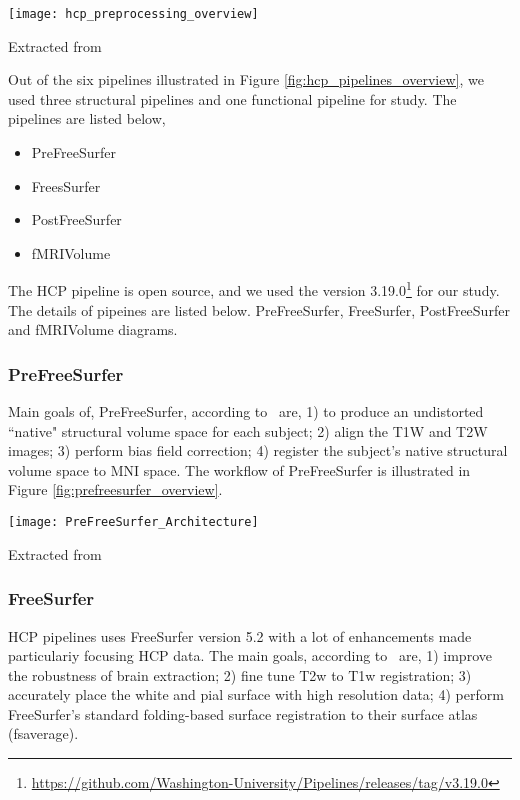 \begin{center}
   \texttt{[image: hcp\_preprocessing\_overview]}
   \label{fig:hcp_pipelines_overview}
   \caption*{Extracted from \cite{Gla13}}
\end{center}

Out of the six pipelines illustrated in Figure \ref{fig:hcp_pipelines_overview}, we used three structural pipelines and one functional pipeline for study. The pipelines are listed below, 
\begin{itemize}
  \item PreFreeSurfer
  \item FreesSurfer
  \item PostFreeSurfer
  \item fMRIVolume
\end{itemize}

The HCP pipeline is open source, and we used the version 3.19.0\footnote{\url{https://github.com/Washington-University/Pipelines/releases/tag/v3.19.0}} for our study. The details of pipeines are listed below. 
PreFreeSurfer, FreeSurfer, PostFreeSurfer and fMRIVolume diagrams.

\subsubsection{PreFreeSurfer}
Main goals of, PreFreeSurfer, according to~\cite{Gla13} are, 1) to produce an undistorted ``native" structural volume space for each subject; 2) align the T1W and T2W images; 3) perform bias field correction; 4) register the subject's native structural volume space to MNI space. The workflow of PreFreeSurfer is illustrated in Figure \ref{fig:prefreesurfer_overview}.

\begin{center}
  \texttt{[image: PreFreeSurfer\_Architecture]}
  \label{fig:prefreesurfer_overview}
  \caption*{Extracted from \cite{Gla13}}
\end{center}

\subsubsection{FreeSurfer}
HCP pipelines uses FreeSurfer version 5.2 with a lot of enhancements made particulariy focusing HCP data. The main goals, according to~\cite{Gla13} are, 1) improve the robustness of brain extraction; 2) fine tune T2w to T1w registration; 3) accurately place the white and pial surface with high resolution data; 4) perform FreeSurfer's standard folding-based surface registration to their surface atlas (fsaverage).

